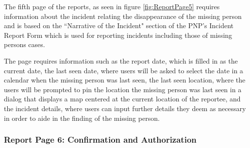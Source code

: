 The fifth page of the reports, as seen in figure \ref{fig:ReportPage5} requires information about the incident relating the disappearance of the missing person and is based on the ``Narrative of the Incident" section of the PNP's Incident Report Form which is used for reporting incidents including those of missing persons cases.

The page requires information such as the report date, which is filled in as the current date, the last seen date, where users will be asked to select the date in a calendar when the missing person was last seen, the last seen location, where the users will be prompted to pin the location the missing person was last seen in a dialog that displays a map centered at the current location of the reportee, and the incident details, where users can input further details they deem as necessary in order to aide in the finding of the missing person. 

\subsubsection{Report Page 6: Confirmation and Authorization}

